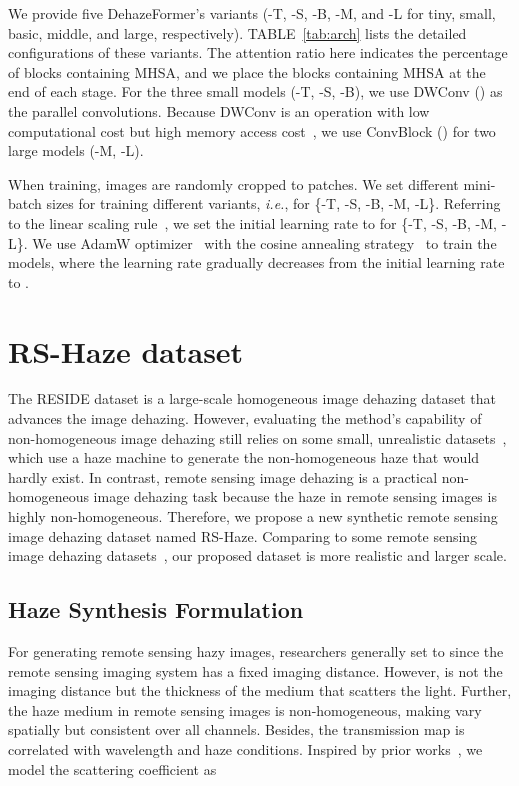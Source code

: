 \documentclass[journal]{IEEEtran}
\begin{document}
We provide five DehazeFormer's variants (-T, -S, -B, -M, and -L for tiny, small, basic, middle, and large, respectively).
TABLE~\ref{tab:arch} lists the detailed configurations of these variants.
The attention ratio here indicates the percentage of blocks containing MHSA, and we place the blocks containing MHSA at the end of each stage.
For the three small models (-T, -S, -B), we use DWConv () as the parallel convolutions.
Because DWConv is an operation with low computational cost but high memory access cost~\cite{ma2018shufflenet}, we use ConvBlock () for two large models (-M, -L).

When training, images are randomly cropped to  patches.
We set different mini-batch sizes for training different variants, \emph{i.e.},  for \{-T, -S, -B, -M, -L\}.
Referring to the linear scaling rule~\cite{goyal2017accurate}, we set the initial learning rate to  for \{-T, -S, -B, -M, -L\}.
We use AdamW optimizer~\cite{loshchilov2017decoupled} with the cosine annealing strategy~\cite{loshchilov2016sgdr} to train the models, where the learning rate gradually decreases from the initial learning rate to .
 \section{RS-Haze dataset}

The RESIDE dataset is a large-scale homogeneous image dehazing dataset that advances the image dehazing.
However, evaluating the method's capability of non-homogeneous image dehazing still relies on some small, unrealistic datasets~\cite{ancuti2020nh}, which use a haze machine to generate the non-homogeneous haze that would hardly exist.
In contrast, remote sensing image dehazing is a practical non-homogeneous image dehazing task because the haze in remote sensing images is highly non-homogeneous.
Therefore, we propose a new synthetic remote sensing image dehazing dataset named RS-Haze.
Comparing to some remote sensing image dehazing datasets~\cite{huang2020single,li2020coarse,mehta2021domain,darbaghshahi2021cloud}, our proposed dataset is more realistic and larger scale.

\subsection{Haze Synthesis Formulation}
For generating remote sensing hazy images, researchers generally set  to  since the remote sensing imaging system has a fixed imaging distance. 
However,  is not the imaging distance but the thickness of the medium that scatters the light.
Further, the haze medium in remote sensing images is non-homogeneous, making  vary spatially but consistent over all channels.
Besides, the transmission map  is correlated with wavelength and haze conditions. 
Inspired by prior works~\cite{mccartney1976optics,nayar1999vision}, we model the scattering coefficient as
\end{document}
